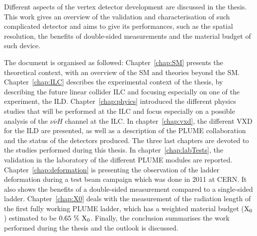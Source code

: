   Different aspects of the vertex detector development are discussed in the thesis.
  This work gives an overview of the validation and characterisation of such complicated detector and aims to give its performances, such as the spatial resolution, the benefits of double-sided measurements and the material budget of such device.

  The document is organised as followed:
  Chapter~\ref{chap:SM} presents the theoretical context, with an overview of the \gls{SM} and theories beyond the \gls{SM}.
  Chapter~\ref{chap:ILC} describes the experimental context of the thesis, by describing the future linear collider \gls{ILC} and focusing especially on one of the experiment, the \gls{ILD}.
  Chapter~\ref{chap:phyics} introduced the different physics studies that will be performed at the \gls{ILC} and focus especially on a possible analysis of the $\nu\overline{\nu}H$ channel at the \gls{ILC}.
  In chapter~\ref{chap:vxd}, the different \gls{VXD} for the \gls{ILD} are presented, as well as a description of the \gls{PLUME} collaboration and the status of the detectors produced.
  The three last chapters are devoted to the studies performed during this thesis.
  In chapter~\ref{chap:labTests}, the validation in the laboratory of the different \gls{PLUME} modules are reported.
  Chapter~\ref{chap:deformation} is presenting the observation of the ladder deformation during a test beam campaign which was done in 2011 at CERN. 
  It also shows the benefits of a double-sided measurement compared to a single-sided ladder.
  Chapter~\ref{chap:X0} deals with the measurement of the radiation length of the first fully working \gls{PLUME} ladder, which has a weighted material budget ($\rm{X_0}$) estimated to be $0.65~\%~\rm{X_0}$.
  Finally, the conclusion summarises the work performed during the thesis and the outlook is discussed.

